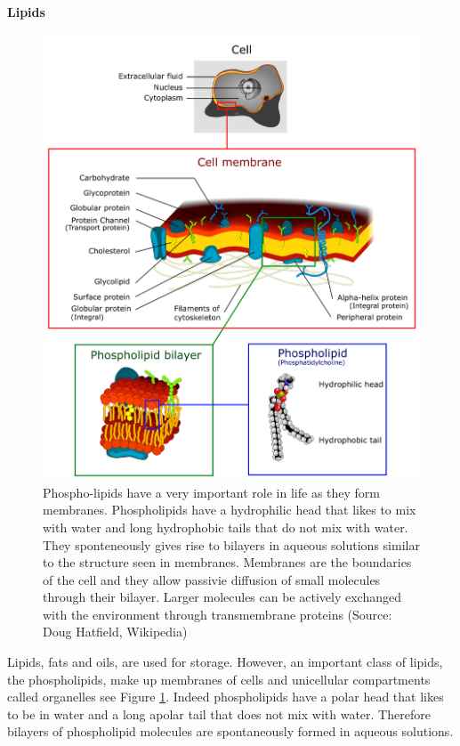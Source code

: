 \documentclass[
  11pt,
]{book}
\begin{document}
\hypertarget{lipids}{%
\paragraph{Lipids}\label{lipids}}

\begin{figure}

{\centering \includegraphics[width=0.8\linewidth]{./figs/Cell_membrane_detailed_diagram_4} 

}

\caption{Phospho-lipids have a very important role in life as they form membranes. Phospholipids have a hydrophilic head that likes to mix with water and long hydrophobic tails that do not mix with water. They sponteneously gives rise to bilayers in aqueous solutions similar to the structure seen in membranes. Membranes are the boundaries of the cell and they allow passivie diffusion of small molecules through their bilayer. Larger molecules can be actively exchanged with the environment through transmembrane proteins (Source: Doug Hatfield, Wikipedia)}\label{fig:lipids}
\end{figure}

Lipids, fats and oils, are used for storage. However, an important class of lipids, the phospholipids, make up membranes of cells and unicellular compartments called organelles see Figure \ref{fig:lipids}. Indeed phospholipids have a polar head that likes to be in water and a long apolar tail that does not mix with water. Therefore bilayers of phospholipid molecules are spontaneously formed in aqueous solutions.
\end{document}
